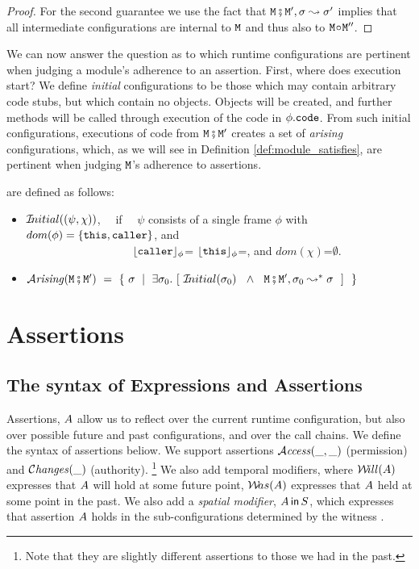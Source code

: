 \begin{proof} For the second guarantee  we use the fact that   ${\mbox{\tt{\ensuremath{{\mbox{\tt{M}}}}}}} \fatsemi {\mbox{\tt{\ensuremath{{\mbox{\tt{M}}}}}}}', \sigma \leadsto \sigma'$ implies that all
intermediate configurations are internal to ${\mbox{\tt{\ensuremath{{\mbox{\tt{M}}}}}}}$ and thus also to ${\mbox{\tt{\ensuremath{{\mbox{\tt{M}}}}}}}\!\circ\!{\mbox{\tt{\ensuremath{{\mbox{\tt{M}}}}}}}''$.
\end{proof}

We can now answer the question as to which runtime configurations are pertinent when judging a module's
adherence to an assertion.
First, where does execution start? We define {\em initial} configurations to be those which may contain arbitrary code stubs, but which contain no objects. Objects will be created, and further methods will be called through execution of the code in $\phi.{\mbox{\tt{code}}}$. From such initial configurations, executions of code from ${\mbox{\tt{\ensuremath{{\mbox{\tt{M}}}}}}} \fatsemi {\mbox{\tt{\ensuremath{{\mbox{\tt{M}}}}}}}'$ creates a set of {\em arising} configurations, which, as we will see in Definition \ref{def:module_satisfies}, are pertinent when judging ${\mbox{\tt{\ensuremath{{\mbox{\tt{M}}}}}}}$'s  adherence to assertions.

\begin{definition} are defined as follows:  

\begin{itemize}
     \item 
   ${{\mathcal I}\!nitial}((\psi,\chi))$, \ \ if \ \ $\psi$ consists of a single frame $\phi$ with $dom(\phi)=\{ {\mbox{\tt{this}}}, {\mbox{\tt{caller}}} \}$, and \\
    $\ \strut \hspace{1.2in} $ ${\lfloor{ {{\mbox{\tt{caller}}}}}\rfloor_{\phi}}$= ${\lfloor{ {{\mbox{\tt{this}}}}}\rfloor_{\phi}}$=\nullK, and $dom(\chi)$=$\emptyset$.
 \item
 $\Arising  {\M\mkpair\M'} \ = \ \{ \ \sigma \ \mid \ \exists \sigma_0. \ [\  \Initial{\sigma_0} \  \ \wedge\ \  \M\mkpair\M', \sigma_0 \leadsto^* \sigma \ \ ] \ \ \} $
 \end{itemize}

\end{definition}

 

 
\section{ Assertions}
\label{sect:assertions}

\subsection{The syntax of Expressions and Assertions}
Assertions, $A$ allow us to reflect over the current runtime configuration, but also over possible future and past configurations, and over 
the call chains.  We define the syntax of assertions beliow.
We support assertions ${\mathcal{A}}\textrm{\textit{ccess}}(\_,\_)$  (permission)
and   $\mathcal{C}\textrm{\textit{hanges}}(\_)$ (authority). \footnote{Note that they are slightly different
assertions to those we had in the past.}
We also add temporal modifiers, where ${{\mathcal W}\!ill}(A)$ expresses that $A$ will hold at some future point,
${{\mathcal W}\!as}(A)$ expresses that $A$ held at some point in the past.
We also add a {\em spatial modifier}, $A\,{\bf{\sf {in}}}\, S$, which expresses that assertion $A$ holds in
the sub-configurations determined by the witness .

